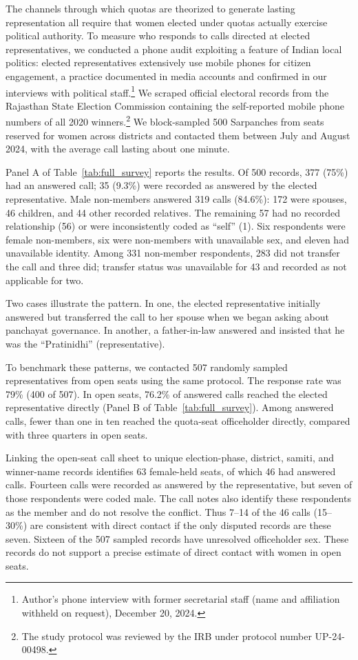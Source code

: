 \documentclass[12pt]{article}
\begin{document}
The channels through which quotas are theorized to generate lasting representation all require that women elected under quotas actually exercise political authority. To measure who responds to calls directed at elected representatives, we conducted a phone audit exploiting a feature of Indian local politics: elected representatives extensively use mobile phones for citizen engagement, a practice documented in media accounts \citep{rigillo2018whatsapp} and confirmed in our interviews with political staff.\footnote{Author's phone interview with former secretarial staff (name and affiliation withheld on request), December 20, 2024.} We scraped official electoral records from the Rajasthan State Election Commission containing the self-reported mobile phone numbers of all 2020 winners.\footnote{The study protocol was reviewed by the IRB under protocol number UP-24-00498.} We block-sampled 500 Sarpanches from seats reserved for women across districts and contacted them between July and August 2024, with the average call lasting about one minute.

Panel A of Table~\ref{tab:full_survey} reports the results. Of 500 records, 377 (75\%) had an answered call; 35 (9.3\%) were recorded as answered by the elected representative. Male non-members answered 319 calls (84.6\%): 172 were spouses, 46 children, and 44 other recorded relatives. The remaining 57 had no recorded relationship (56) or were inconsistently coded as ``self'' (1). Six respondents were female non-members, six were non-members with unavailable sex, and eleven had unavailable identity. Among 331 non-member respondents, 283 did not transfer the call and three did; transfer status was unavailable for 43 and recorded as not applicable for two.

Two cases illustrate the pattern. In one, the elected representative initially answered but transferred the call to her spouse when we began asking about panchayat governance. In another, a father-in-law answered and insisted that he was the ``Pratinidhi'' (representative).

To benchmark these patterns, we contacted 507 randomly sampled representatives from open seats using the same protocol. The response rate was 79\% (400 of 507). In open seats, 76.2\% of answered calls reached the elected representative directly (Panel B of Table~\ref{tab:full_survey}). Among answered calls, fewer than one in ten reached the quota-seat officeholder directly, compared with three quarters in open seats.

Linking the open-seat call sheet to unique election-phase, district, samiti, and winner-name records identifies 63 female-held seats, of which 46 had answered calls. Fourteen calls were recorded as answered by the representative, but seven of those respondents were coded male. The call notes also identify these respondents as the member and do not resolve the conflict. Thus 7--14 of the 46 calls (15--30\%) are consistent with direct contact if the only disputed records are these seven. Sixteen of the 507 sampled records have unresolved officeholder sex. These records do not support a precise estimate of direct contact with women in open seats.
\end{document}
